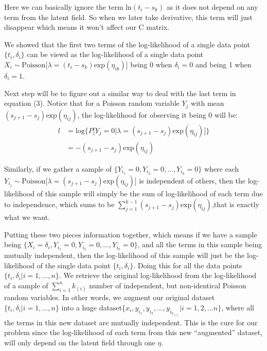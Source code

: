 \documentclass[]{article}
\begin{document}
Here we can basically ignore the term \(\text{ln}(t_i-s_k)\) as it does
not depend on any term from the latent field. So when we later take
derivative, this term will just disappear which means it won't affect
our C matrix.

We showed that the first two terms of the log-likelihood of a single
data point \(\{t_i,\delta_i\}\) can be viewd as the log-likelihood of a
single data point
\(X_i\sim \text{Poisson}\big[\lambda =(t_i-s_k)\text{exp}(\eta_{ik})\big]\)
being \(0\) when \(\delta_i = 0\) and being 1 when \(\delta_i = 1\).

Next step will be to figure out a similar way to deal with the last term
in equation (3). Notice that for a Poisson random variable \(Y_j\) with
mean \((s_{j+1}-s_j)\text{exp}(\eta_{ij})\), the log-likelihood for
observing it being \(0\) will be:
\begin{equation}\begin{aligned}\label{eqn:loglike3}
l &= \text{log}\bigg \{P\big [Y_j =0|\lambda = (s_{j+1}-s_j)\text{exp}(\eta_{ij})\big ]\bigg \}\\
  &= -(s_{j+1}-s_j)\text{exp}(\eta_{ij})
\end{aligned}\end{equation}

Similarly, if we gather a sample of
\(\{Y_{i_{1}}=0,Y_{i_{2}} =0, ..., Y_{i_{k}}=0 \}\) where each
\(Y_{i_j} \sim \text{Poisson}\big[\lambda = (s_{j+1}-s_j)\text{exp}(\eta_{ij})\big]\)
is independent of others, then the log-likelihood of this sample will
simply be the sum of log-likelihood of each term due to independence,
which sums to be
\(\sum_{j=1}^{k-1} (s_{j+1}-s_j)\text{exp}(\eta_{ij})\),that is exactly
what we want.

Putting these two pieces information together, which means if we have a
sample being
\(\{X_i =\delta_i,Y_{i_{1}}=0,Y_{i_{2}} =0, ..., Y_{i_{k}}=0 \}\), and
all the terms in this sample being mutually independent, then the
log-likelihood of this sample will just be the log-likelihood of the
single data point \(\{t_i,\delta_i\}\). Doing this for all the data
points \(\{t_i,\delta_i|i=1,...,n\}\). We retrieve the original
log-likelihood from the log-likelihood of a sample of
\(\sum_{i=1}^{n}{k_{(i)}}\) number of independent, but non-identical
Poisson random variables. In other words, we augment our original
dataset \(\{t_i,\delta_i|i=1,...,n\}\) into a huge
dataset\(\{x_i ,y_{i_{1}},y_{i_{2}}, ..., y_{i_{k_{(i)}}}|i=1,2,...n\}\),
where all the terms in this new dataset are mutually independent. This
is the cure for our problem since the log-likelihood of each term from
this new ``augmented'' dataset, will only depend on the latent field
through one \(\eta\).
\end{document}
